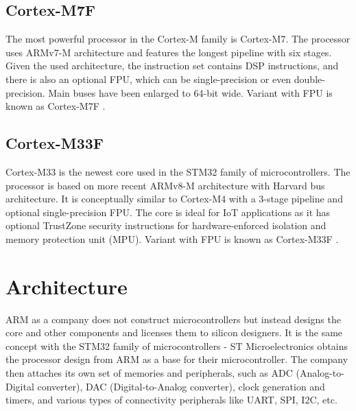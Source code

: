 	\subsection{Cortex-M7F}
	\label{sub:stm_m7}
The most powerful processor in the Cortex-M family is Cortex-M7. The processor uses ARMv7-M architecture and features the longest pipeline with six stages. Given the used architecture, the instruction set contains DSP instructions, and there is also an optional FPU, which can be single-precision or even double-precision. Main buses have been enlarged to 64-bit wide. Variant with FPU is known as Cortex-M7F \cite{m7_web}. 
	
	\subsection{Cortex-M33F}
	\label{sub:stm_m33}
Cortex-M33 is the newest core used in the STM32 family of microcontrollers. The processor is based on more recent ARMv8-M architecture with Harvard bus architecture. It is conceptually similar to Cortex-M4 with a 3-stage pipeline and optional single-precision FPU. The core is ideal for IoT applications as it has optional TrustZone security instructions for hardware-enforced isolation and memory protection unit (MPU). Variant with FPU is known as Cortex-M33F \cite{m33_web}. 

\section{Architecture}
\label{sec:stm_arch}
ARM as a company does not construct microcontrollers but instead designs the core and other components and licenses them to silicon designers. It is the same concept with the STM32 family of microcontrollers - ST Microelectronics obtains the processor design from ARM as a base for their microcontroller. The company then attaches its own set of memories and peripherals, such as ADC (Analog-to-Digital converter), DAC (Digital-to-Analog converter), clock generation and timers, and various types of connectivity peripherals like UART, SPI, I2C, etc.

